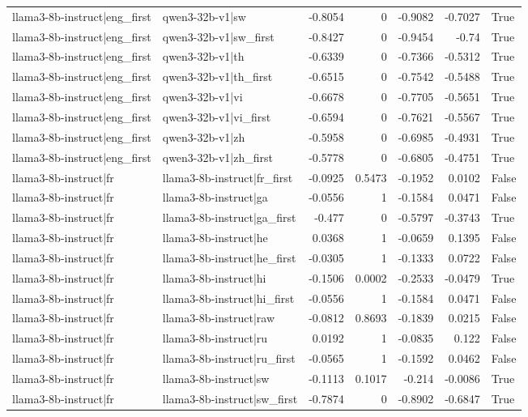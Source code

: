 \begin{table}
\begin{tabular}{l l r r r r l}
llama3-8b-instruct|eng_first & qwen3-32b-v1|sw & -0.8054 & 0 & -0.9082 & -0.7027 & True \\
llama3-8b-instruct|eng_first & qwen3-32b-v1|sw_first & -0.8427 & 0 & -0.9454 & -0.74 & True \\
llama3-8b-instruct|eng_first & qwen3-32b-v1|th & -0.6339 & 0 & -0.7366 & -0.5312 & True \\
llama3-8b-instruct|eng_first & qwen3-32b-v1|th_first & -0.6515 & 0 & -0.7542 & -0.5488 & True \\
llama3-8b-instruct|eng_first & qwen3-32b-v1|vi & -0.6678 & 0 & -0.7705 & -0.5651 & True \\
llama3-8b-instruct|eng_first & qwen3-32b-v1|vi_first & -0.6594 & 0 & -0.7621 & -0.5567 & True \\
llama3-8b-instruct|eng_first & qwen3-32b-v1|zh & -0.5958 & 0 & -0.6985 & -0.4931 & True \\
llama3-8b-instruct|eng_first & qwen3-32b-v1|zh_first & -0.5778 & 0 & -0.6805 & -0.4751 & True \\
llama3-8b-instruct|fr & llama3-8b-instruct|fr_first & -0.0925 & 0.5473 & -0.1952 & 0.0102 & False \\
llama3-8b-instruct|fr & llama3-8b-instruct|ga & -0.0556 & 1 & -0.1584 & 0.0471 & False \\
llama3-8b-instruct|fr & llama3-8b-instruct|ga_first & -0.477 & 0 & -0.5797 & -0.3743 & True \\
llama3-8b-instruct|fr & llama3-8b-instruct|he & 0.0368 & 1 & -0.0659 & 0.1395 & False \\
llama3-8b-instruct|fr & llama3-8b-instruct|he_first & -0.0305 & 1 & -0.1333 & 0.0722 & False \\
llama3-8b-instruct|fr & llama3-8b-instruct|hi & -0.1506 & 0.0002 & -0.2533 & -0.0479 & True \\
llama3-8b-instruct|fr & llama3-8b-instruct|hi_first & -0.0556 & 1 & -0.1584 & 0.0471 & False \\
llama3-8b-instruct|fr & llama3-8b-instruct|raw & -0.0812 & 0.8693 & -0.1839 & 0.0215 & False \\
llama3-8b-instruct|fr & llama3-8b-instruct|ru & 0.0192 & 1 & -0.0835 & 0.122 & False \\
llama3-8b-instruct|fr & llama3-8b-instruct|ru_first & -0.0565 & 1 & -0.1592 & 0.0462 & False \\
llama3-8b-instruct|fr & llama3-8b-instruct|sw & -0.1113 & 0.1017 & -0.214 & -0.0086 & True \\
llama3-8b-instruct|fr & llama3-8b-instruct|sw_first & -0.7874 & 0 & -0.8902 & -0.6847 & True \\

\end{tabular}
\end{table}
